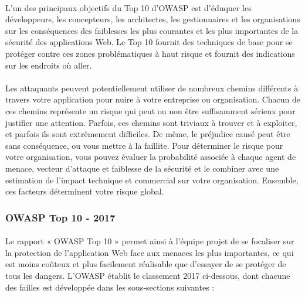 	    \paragraph{}
	    L'un des principaux objectifs du Top 10 d'OWASP est d'éduquer les développeurs, les concepteurs, les architectes, les gestionnaires et les organisations sur les conséquences des faiblesses les plus courantes et les plus importantes de la sécurité des applications Web. Le Top 10 fournit des techniques de base pour se protéger contre ces zones problématiques à haut risque et fournit des indications sur les endroits où aller.
	    \paragraph{}
	    Les attaquants peuvent potentiellement utiliser de nombreux chemins différents à travers votre application pour nuire à votre entreprise ou organisation. Chacun de ces chemins représente un risque qui peut ou non être suffisamment sérieux pour justifier une attention. Parfois, ces chemins sont triviaux à trouver et à exploiter, et parfois ils sont extrêmement difficiles. De même, le préjudice causé peut être sans conséquence, ou vous mettre à la faillite. Pour déterminer le risque pour votre organisation, vous pouvez évaluer la probabilité associée à chaque agent de menace, vecteur d'attaque et faiblesse de la sécurité et le combiner avec une estimation de l'impact technique et commercial sur votre organisation. Ensemble, ces facteurs déterminent votre risque global.
	    
	    \subsubsection{OWASP Top 10 - 2017}
	      \paragraph{}
	      Le rapport « OWASP Top 10 » permet ainsi à l’équipe projet de se focaliser sur la protection de l’application Web
	      face aux menaces les plus importantes, ce qui est moins co\^uteux et plus facilement réalisable
	      que d’essayer de se protéger de tous les dangers. L’OWASP établit le classement 2017
	      ci-dessous, dont chacune des failles est développée dans les sous-sections suivantes :
	            
